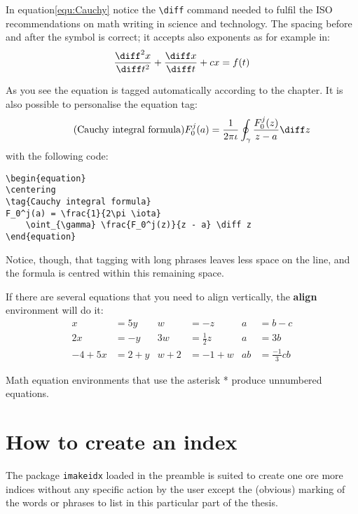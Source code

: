 In equation\eqref{equ:Cauchy} notice the \verb|\diff| command needed to fulfil the ISO recommendations on math writing in science and technology. The spacing before and after the symbol is correct; it accepts also exponents as for example in:
\begin{equation}
\frac{\diff^2 x}{\diff t^2} + \frac{\diff x}{\diff t} + c x= f(t)
\end{equation}


As you see the equation is tagged automatically according to the chapter. It is also possible to personalise the equation tag:
\begin{equation}
\centering
\tag{Cauchy integral formula}
F_0^j(a) = \frac{1}{2\pi \iota} \oint_{\gamma} \frac{F_0^j(z)}{z - a} \diff z
\end{equation}
with the following code:
\begin{verbatim}
\begin{equation}
\centering
\tag{Cauchy integral formula}
F_0^j(a) = \frac{1}{2\pi \iota} 
    \oint_{\gamma} \frac{F_0^j(z)}{z - a} \diff z
\end{equation}
\end{verbatim}
Notice, though, that tagging with long phrases leaves less space on the line, and the formula is centred within this remaining space.


If there are several equations that you need to align vertically, the \textbf{align} environment will do it:
\begin{align*}
	x&=5y          &  w &=-z             &  a&=b-c\\
	2x&=-y         &  3w&=\frac{1}{2}z   &  a&=3b \\
	-4 + 5x&=2+y   &  w+2&=-1+w          &  ab&=\frac{-1}{3}cb
\end{align*}

Math equation environments that use  the asterisk * produce unnumbered   equations.

\section{How to create an index}%

The package \texttt{imakeidx} loaded in the preamble is suited to create one ore more indices without any specific action by the user except the (obvious) marking of the words or phrases to list in this particular part of the thesis.

